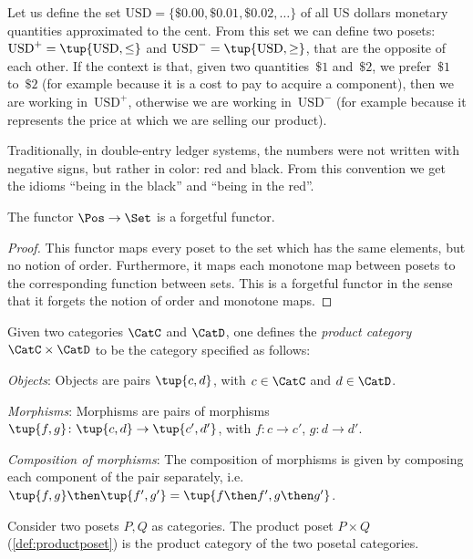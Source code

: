 \begin{example}
   Let us define the set $\text{USD}=\{\$0.00,\$0.01,\$0.02,\dots\}$
   of all US dollars monetary quantities approximated to the cent.
   From this set we can define two posets: $\text{USD}^{+} = \tup{\text{USD}, \leq}$ and $\text{USD}^{-} = \tup{\text{USD}, \geq}$, that are the opposite of each other.
   If the context is that, given two quantities~$\$1$ and~$\$2$,
   we prefer~$\$1$ to~$\$2$ (for example because it is a cost to pay to acquire a component), then we are working in~$\text{USD}^{+}$,
   otherwise we are working in~$\text{USD}^{-}$ (for example
   because it represents the price at which we are selling our product).

   Traditionally, in double-entry ledger systems, the numbers were not
   written with negative signs, but rather in color: red and black.
   From this convention we get the idioms ``being in the black''
   and ``being in the red''.
\end{example}

\begin{lemma}
The functor $\Pos \to \Set$ is a forgetful functor.
\end{lemma}
\begin{proof}
This functor maps every poset to the set which has the same elements, but no notion of order. Furthermore, it maps each monotone map between posets to the corresponding function between sets. This is a forgetful functor in the sense that it forgets the notion of order and monotone maps.
\end{proof}

\begin{shaded}
\begin{definition}
Given two categories $\CatC$ and $\CatD$, one defines the \emph{product category} $\CatC \times \CatD$ to be the category specified as follows:
\begin{compactenum}
    \item \emph{Objects}: Objects are pairs $\tup{c,d}$, with $c\in \CatC$ and $d\in \CatD$.
    \item \emph{Morphisms}: Morphisms are pairs of morphisms $\tup{f,g}\colon \tup{c,d}\to \tup{c',d'}$, with $f\colon c\to c'$, $g\colon d\to d'$.
    \item \emph{Composition of morphisms}: The composition of morphisms is given by composing each component of the pair separately, i.e. $\tup{f,g}\then \tup{f',g'}=\tup{f\then f',g\then g'}$. 
\end{compactenum}
\end{definition}
\end{shaded}
\begin{example}
Consider two posets $P,Q$ as categories. The product poset $P\times Q$ (\cref{def:productposet}) is the product category of the two posetal categories.
\end{example}

